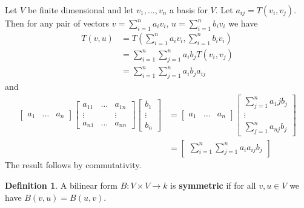 \documentclass[12pt]{article}
\theoremstyle{plain}
\theoremstyle{definition}
\newtheorem{defn}[thm]{Definition} %
\newcommand{\lto}{\longrightarrow}
\begin{document}
Let $V$ be finite dimensional and let $v_1,...,v_n$ a basis for $V$. Let $a_{ij} = T(v_i,v_j)$. Then for any pair of vectors $v = \sum_{i = 1}^na_{i}v_i$, $u = \sum_{i = 1}^nb_iv_i$ we have
\begin{align*}
    T(v,u) &= T(\sum_{i = 1}^n a_i v_i, \sum_{i = 1}^nb_i v_i)\\
    &= \sum_{i = 1}^n\sum_{j = 1}^na_ib_jT(v_i, v_j)\\
    & = \sum_{i = 1}^n\sum_{j = 1}^n a_ib_j a_{ij}
\end{align*}
and
\begin{align*}
    \begin{bmatrix}
    a_1 & \hdots & a_n
    \end{bmatrix}
    \begin{bmatrix}
    a_{11} & \hdots & a_{1n}\\
    \vdots & & \vdots\\
    a_{n1} & \hdots & a_{nn}
    \end{bmatrix}
    \begin{bmatrix}
    b_1\\
    \vdots\\
    b_n
    \end{bmatrix}
    &=
    \begin{bmatrix}
    a_1 & \hdots & a_n
    \end{bmatrix}
    \begin{bmatrix}
    \sum_{j = 1}^n a_1j b_j\\
    \vdots\\
    \sum_{j = 1}^n a_{nj} b_j
    \end{bmatrix}\\
    &=
    \begin{bmatrix}
    \sum_{i = 1}^n\sum_{j = 1}^n a_ia_{ij}b_j
    \end{bmatrix}
\end{align*}
The result follows by commutativity.

\begin{defn}
A bilinear form $B: V \times V \lto k$ is \textbf{symmetric} if for all $v,u \in V$ we have $B(v,u) = B(u,v)$.
\end{defn}
\end{document}
